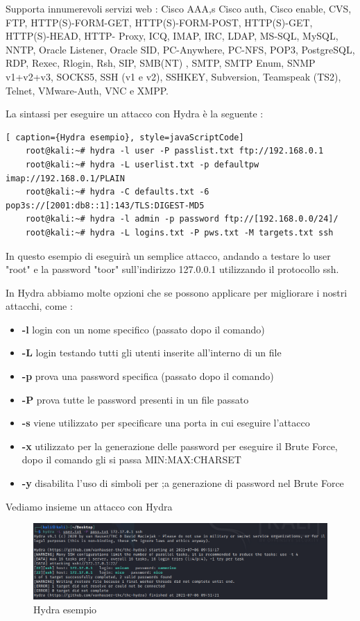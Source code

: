 Supporta innumerevoli servizi web : Cisco AAA,s Cisco auth, Cisco enable, CVS, FTP, HTTP(S)-FORM-GET, HTTP(S)-FORM-POST, HTTP(S)-GET, HTTP(S)-HEAD, HTTP- Proxy, ICQ, IMAP, IRC, LDAP, MS-SQL, MySQL, NNTP, Oracle Listener, Oracle SID, PC-Anywhere, PC-NFS, POP3, PostgreSQL, RDP, Rexec, Rlogin, Rsh, SIP, SMB(NT) , SMTP, SMTP Enum, SNMP v1+v2+v3, SOCKS5, SSH (v1 e v2), SSHKEY, Subversion, Teamspeak (TS2), Telnet, VMware-Auth, VNC e XMPP.

La sintassi per eseguire un attacco con Hydra è la seguente :

\begin{lstlisting}[ caption={Hydra esempio}, style=javaScriptCode]
    root@kali:~# hydra -l user -P passlist.txt ftp://192.168.0.1
    root@kali:~# hydra -L userlist.txt -p defaultpw imap://192.168.0.1/PLAIN
    root@kali:~# hydra -C defaults.txt -6 pop3s://[2001:db8::1]:143/TLS:DIGEST-MD5
    root@kali:~# hydra -l admin -p password ftp://[192.168.0.0/24]/
    root@kali:~# hydra -L logins.txt -P pws.txt -M targets.txt ssh
\end{lstlisting}

In questo esempio di eseguirà un semplice attacco, andando a testare lo user "root" e la password "toor" sull'indirizzo 127.0.0.1 utilizzando il protocollo ssh.

In Hydra abbiamo molte opzioni che se possono applicare per migliorare i nostri attacchi, come :
\begin{itemize}
    \item \textbf{-l} login con un nome specifico (passato dopo il comando)
    \item \textbf{-L} login testando tutti gli utenti inserite all'interno di un file 
    \item \textbf{-p} prova una password specifica (passato dopo il comando)
    \item \textbf{-P} prova tutte le password presenti in un file passato
    \item \textbf{-s} viene utilizzato per specificare una porta in cui eseguire l'attacco 
    \item \textbf{-x} utilizzato per la generazione delle password per eseguire il Brute Force, dopo il comando gli si passa MIN:MAX:CHARSET
    \item \textbf{-y} disabilita l'uso di simboli per ;a generazione di password nel Brute Force
\end{itemize}

Vediamo insieme un attacco con Hydra 

\begin{figure}[htpb!]
    \centering
    \includegraphics[width=\linewidth]{Immagini/5/hydra.png}
    \caption{Hydra esempio}
    \label{fig:Hydra esempio}
\end{figure}

